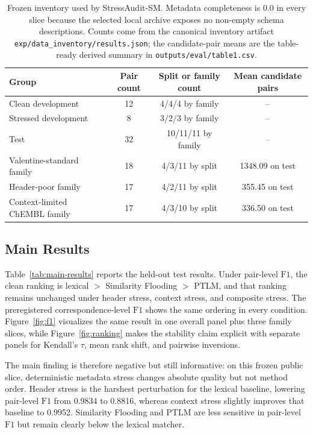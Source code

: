 \documentclass{article}
\newcommand{\stressaudit}{StressAudit-SM}
\newcommand{\fone}{\mbox{$\mathrm{F1}$}}
\begin{document}
\begin{table}[t]
  \caption{Frozen inventory used by \stressaudit. Metadata completeness is 0.0 in every slice because the selected local archive exposes no non-empty schema descriptions. Counts come from the canonical inventory artifact \texttt{exp/data\_inventory/results.json}; the candidate-pair means are the table-ready derived summary in \texttt{outputs/eval/table1.csv}.}
  \label{tab:inventory}
  \centering
  \small
  \begin{tabular}{lccc}
    \toprule
    Group & Pair count & Split or family count & Mean candidate pairs \\
    \midrule
    Clean development & 12 & 4/4/4 by family & -- \\
    Stressed development & 8 & 3/2/3 by family & -- \\
    Test & 32 & 10/11/11 by family & -- \\
    Valentine-standard family & 18 & 4/3/11 by split & 1348.09 on test \\
    Header-poor family & 17 & 4/2/11 by split & 355.45 on test \\
    Context-limited ChEMBL family & 17 & 4/3/10 by split & 336.50 on test \\
    \bottomrule
  \end{tabular}
\end{table}

\subsection{Main Results}

Table~\ref{tab:main-results} reports the held-out test results. Under pair-level \fone{}, the clean ranking is lexical $>$ Similarity Flooding $>$ PTLM, and that ranking remains unchanged under header stress, context stress, and composite stress. The preregistered correspondence-level \fone{} shows the same ordering in every condition. Figure~\ref{fig:f1} visualizes the same result in one overall panel plus three family slices, while Figure~\ref{fig:ranking} makes the stability claim explicit with separate panels for Kendall's $\tau$, mean rank shift, and pairwise inversions.

The main finding is therefore negative but still informative: on this frozen public slice, deterministic metadata stress changes absolute quality but not method order. Header stress is the harshest perturbation for the lexical baseline, lowering pair-level \fone{} from 0.9834 to 0.8816, whereas context stress slightly improves that baseline to 0.9952. Similarity Flooding and PTLM are less sensitive in pair-level \fone{} but remain clearly below the lexical matcher.
\end{document}
